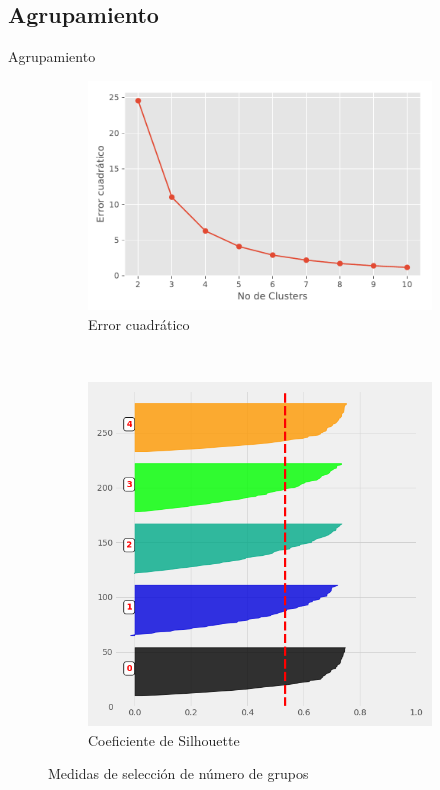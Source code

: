 \documentclass[xcolor=dvipsnames]{beamer}
\begin{document}
\subsection{Agrupamiento}
\begin{frame}{Agrupamiento}
 \begin{figure}
		\centering
		\begin{subfigure}[b]{0.5\textwidth}
			\includegraphics[width=\textwidth]{Clusters.pdf}
			\caption{Error cuadrático}
		\end{subfigure}
		~ %
		\begin{subfigure}[b]{0.35\textwidth}
			\includegraphics[width=\textwidth]{S.png}
			\caption{ Coeficiente de Silhouette}
		\end{subfigure}
		\caption*{Medidas de selección de número de grupos}
	\end{figure}
\end{frame}
\end{document}
